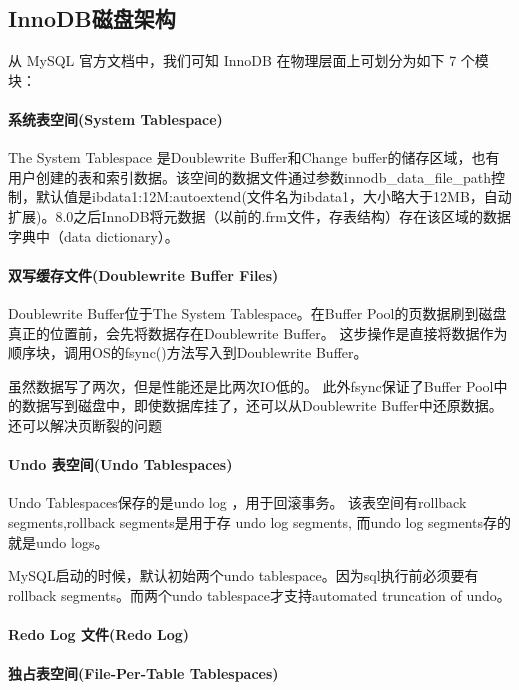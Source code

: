 \documentclass[../../../interview-questions.tex]{subfiles}
\begin{document}
\subsection{InnoDB磁盘架构}

从 MySQL 官方文档中，我们可知 InnoDB 在物理层面上可划分为如下 7 个模块：

\paragraph{系统表空间(System Tablespace)}

The System Tablespace 是Doublewrite Buffer和Change buffer的储存区域，也有用户创建的表和索引数据。该空间的数据文件通过参数innodb\_data\_file\_path控制，默认值是ibdata1:12M:autoextend(文件名为ibdata1，大小略大于12MB，自动扩展)。8.0之后InnoDB将元数据（以前的.frm文件，存表结构）存在该区域的数据字典中（data dictionary）。

\paragraph{双写缓存文件(Doublewrite Buffer Files)}

Doublewrite Buffer位于The System Tablespace。在Buffer Pool的页数据刷到磁盘真正的位置前，会先将数据存在Doublewrite Buffer。 这步操作是直接将数据作为顺序块，调用OS的fsync()方法写入到Doublewrite Buffer。

虽然数据写了两次，但是性能还是比两次IO低的。
此外fsync保证了Buffer Pool中的数据写到磁盘中，即使数据库挂了，还可以从Doublewrite Buffer中还原数据。还可以解决页断裂的问题

\paragraph{Undo 表空间(Undo Tablespaces)}

Undo Tablespaces保存的是undo log ，用于回滚事务。
该表空间有rollback segments,rollback segments是用于存 undo log segments, 而undo log segments存的就是undo logs。

MySQL启动的时候，默认初始两个undo tablespace。因为sql执行前必须要有rollback segments。而两个undo tablespace才支持automated truncation of undo。

\paragraph{Redo Log 文件(Redo Log)}

\paragraph{独占表空间(File-Per-Table Tablespaces)}
\end{document}
